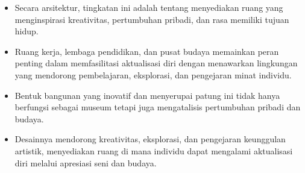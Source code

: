 \documentclass[../manperil.tex]{subfiles}
\begin{document}
\begin{itemize}
	\item Secara arsitektur, tingkatan ini adalah tentang menyediakan ruang yang menginspirasi kreativitas, pertumbuhan pribadi, dan rasa memiliki tujuan hidup.
	\item Ruang kerja, lembaga pendidikan, dan pusat budaya memainkan peran penting dalam memfasilitasi aktualisasi diri dengan menawarkan lingkungan yang mendorong pembelajaran, eksplorasi, dan pengejaran minat individu.
	\item Bentuk bangunan yang inovatif dan menyerupai patung ini tidak hanya berfungsi sebagai museum tetapi juga mengatalisis pertumbuhan pribadi dan budaya.
	\item Desainnya mendorong kreativitas, eksplorasi, dan pengejaran keunggulan artistik, menyediakan ruang di mana individu dapat mengalami aktualisasi diri melalui apresiasi seni dan budaya.
\end{itemize}




\end{document}
